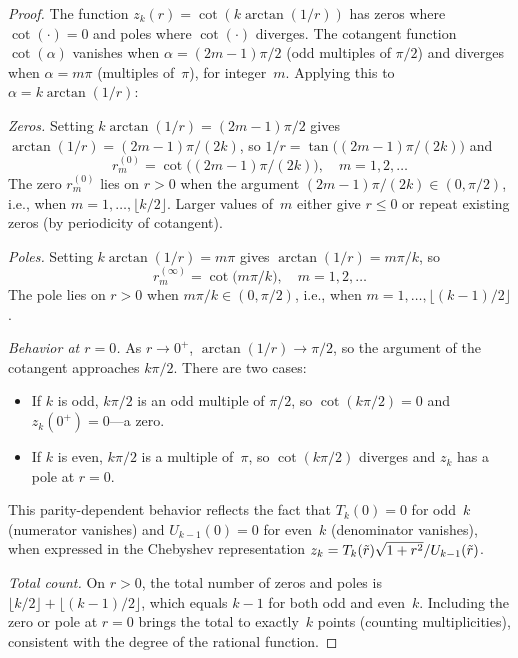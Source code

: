 \begin{proof}
	The function $z_k(r) = \cot(k\arctan(1/r))$ has zeros
	where $\cot(\cdot) = 0$ and poles where $\cot(\cdot)$
	diverges.  The cotangent function $\cot(\alpha)$ vanishes
	when $\alpha = (2m-1)\pi/2$ (odd multiples of $\pi/2$)
	and diverges when $\alpha = m\pi$ (multiples of~$\pi$),
	for integer~$m$.  Applying this to
	$\alpha = k\arctan(1/r)$:

	\textit{Zeros.}  Setting $k\arctan(1/r) = (2m-1)\pi/2$
	gives $\arctan(1/r) = (2m-1)\pi/(2k)$, so
	$1/r = \tan\!\big((2m-1)\pi/(2k)\big)$ and
	\begin{equation}
		r_m^{(0)} = \cot\!\bigl((2m-1)\pi/(2k)\bigr),
		\quad m = 1, 2, \ldots
		\tag{A8}
	\end{equation}
	The zero $r_m^{(0)}$ lies on $r > 0$ when the argument
	$(2m-1)\pi/(2k) \in (0, \pi/2)$, i.e., when
	$m = 1, \ldots, \lfloor k/2 \rfloor$.  Larger values
	of~$m$ either give $r \leq 0$ or repeat existing zeros
	(by periodicity of cotangent).

	\textit{Poles.}  Setting $k\arctan(1/r) = m\pi$ gives
	$\arctan(1/r) = m\pi/k$, so
	\begin{equation}
		r_m^{(\infty)} = \cot\!\bigl(m\pi/k\bigr),
		\quad m = 1, 2, \ldots
		\tag{A9}
	\end{equation}
	The pole lies on $r > 0$ when $m\pi/k \in (0, \pi/2)$,
	i.e., when $m = 1, \ldots, \lfloor (k-1)/2 \rfloor$.

	\textit{Behavior at $r = 0$.}  As $r \to 0^+$,
	$\arctan(1/r) \to \pi/2$, so the argument of the
	cotangent approaches $k\pi/2$.  There are two cases:
	\begin{itemize}
		\item If $k$ is odd, $k\pi/2$ is an odd multiple
		      of $\pi/2$, so $\cot(k\pi/2) = 0$ and
		      $z_k(0^+) = 0$---a zero.
		\item If $k$ is even, $k\pi/2$ is a multiple
		      of~$\pi$, so $\cot(k\pi/2)$ diverges and
		      $z_k$ has a pole at $r = 0$.
	\end{itemize}
	This parity-dependent behavior reflects the fact
	that $T_k(0) = 0$ for odd~$k$ (numerator vanishes)
	and $U_{k-1}(0) = 0$ for even~$k$ (denominator
	vanishes), when expressed in the Chebyshev
	representation $z_k = T_k(\tilde{r})\sqrt{1+r^2}/U_{k-1}(\tilde{r})$.

	\textit{Total count.}  On $r > 0$, the total number of
	zeros and poles is $\lfloor k/2 \rfloor + \lfloor (k-1)/2 \rfloor$,
	which equals $k - 1$ for both odd and even~$k$.  Including
	the zero or pole at $r = 0$ brings the total to exactly~$k$
	points (counting multiplicities), consistent with the degree
	of the rational function.
\end{proof}


